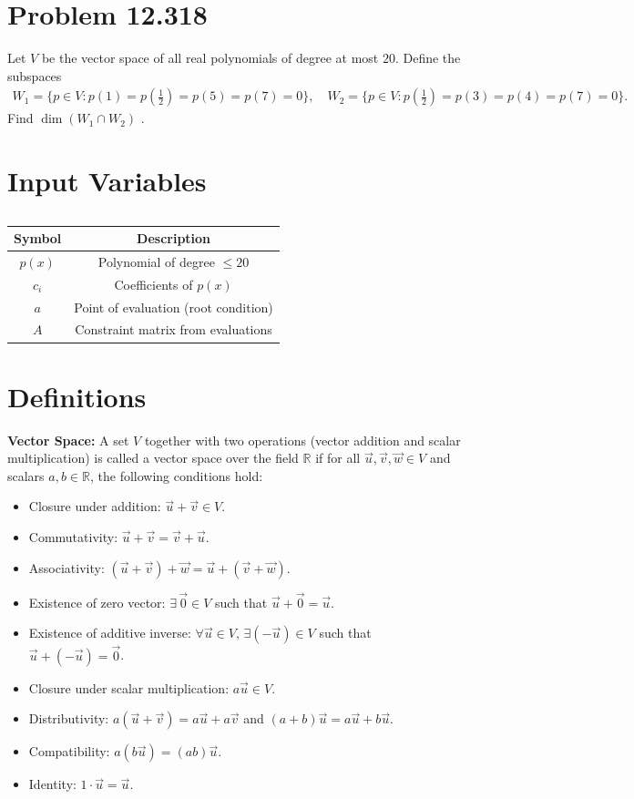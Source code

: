 \documentclass[12pt]{article}
\begin{document}
\section*{Problem 12.318}
Let $V$ be the vector space of all real polynomials of degree at most $20$. 
Define the subspaces
\begin{align}
W_1 = \{ p \in V : p(1)=p(\tfrac12)=p(5)=p(7)=0 \}, \quad 
W_2 = \{ p \in V : p(\tfrac12)=p(3)=p(4)=p(7)=0 \}.
\end{align}
Find $\dim(W_1 \cap W_2)$ .

\section*{Input Variables}
\begin{table}[H]
\centering
\begin{tabular}{|c|c|}
\hline
Symbol & Description \\
\hline
$p(x)$ & Polynomial of degree $\leq 20$ \\
$c_i$ & Coefficients of $p(x)$ \\
$a$ & Point of evaluation (root condition) \\
$A$ & Constraint matrix from evaluations \\
\hline
\end{tabular}
\caption{} \label{}
\end{table}

\section*{Definitions}

\textbf{Vector Space:}  
A set $V$ together with two operations (vector addition and scalar multiplication) is called a vector space over the field $\mathbb{R}$ if for all $\vec{u},\vec{v},\vec{w} \in V$ and scalars $a,b \in \mathbb{R}$, the following conditions hold:
\begin{itemize}
    \item Closure under addition: $\vec{u}+\vec{v} \in V$.
    \item Commutativity: $\vec{u}+\vec{v} = \vec{v}+\vec{u}$.
    \item Associativity: $(\vec{u}+\vec{v})+\vec{w} = \vec{u}+(\vec{v}+\vec{w})$.
    \item Existence of zero vector: $\exists \, \vec{0} \in V$ such that $\vec{u}+\vec{0}=\vec{u}$.
    \item Existence of additive inverse: $\forall \vec{u}\in V, \, \exists (-\vec{u}) \in V$ such that $\vec{u}+(-\vec{u})=\vec{0}$.
    \item Closure under scalar multiplication: $a\vec{u} \in V$.
    \item Distributivity: $a(\vec{u}+\vec{v}) = a\vec{u}+a\vec{v}$ and $(a+b)\vec{u}=a\vec{u}+b\vec{u}$.
    \item Compatibility: $a(b\vec{u})=(ab)\vec{u}$.
    \item Identity: $1\cdot \vec{u}=\vec{u}$.
\end{itemize}
\end{document}

